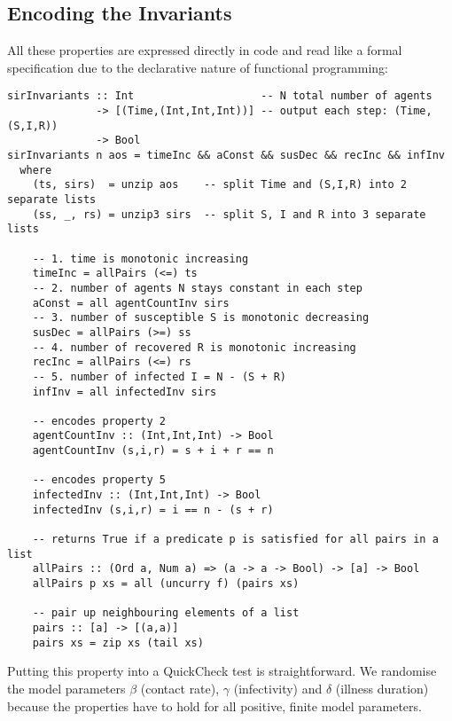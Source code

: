 \subsection{Encoding the Invariants}
All these properties are expressed directly in code and read like a formal specification due to the declarative nature of functional programming:

\begin{footnotesize}
\begin{verbatim}
sirInvariants :: Int                    -- N total number of agents
              -> [(Time,(Int,Int,Int))] -- output each step: (Time,(S,I,R))
              -> Bool
sirInvariants n aos = timeInc && aConst && susDec && recInc && infInv
  where
    (ts, sirs)  = unzip aos    -- split Time and (S,I,R) into 2 separate lists
    (ss, _, rs) = unzip3 sirs  -- split S, I and R into 3 separate lists

    -- 1. time is monotonic increasing
    timeInc = allPairs (<=) ts
    -- 2. number of agents N stays constant in each step
    aConst = all agentCountInv sirs
    -- 3. number of susceptible S is monotonic decreasing
    susDec = allPairs (>=) ss
    -- 4. number of recovered R is monotonic increasing
    recInc = allPairs (<=) rs
    -- 5. number of infected I = N - (S + R)
    infInv = all infectedInv sirs

    -- encodes property 2
    agentCountInv :: (Int,Int,Int) -> Bool
    agentCountInv (s,i,r) = s + i + r == n

    -- encodes property 5
    infectedInv :: (Int,Int,Int) -> Bool
    infectedInv (s,i,r) = i == n - (s + r)

    -- returns True if a predicate p is satisfied for all pairs in a list
    allPairs :: (Ord a, Num a) => (a -> a -> Bool) -> [a] -> Bool
    allPairs p xs = all (uncurry f) (pairs xs)

    -- pair up neighbouring elements of a list
    pairs :: [a] -> [(a,a)]
    pairs xs = zip xs (tail xs)
\end{verbatim}
\end{footnotesize}

Putting this property into a QuickCheck test is straightforward. We randomise the model parameters $\beta$ (contact rate), $\gamma$ (infectivity) and $\delta$ (illness duration) because the properties have to hold for all positive, finite model parameters.

